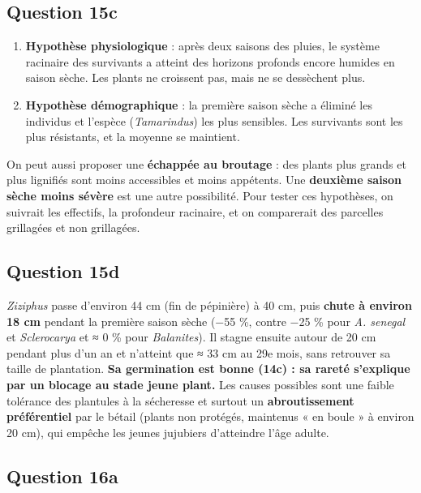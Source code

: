 \documentclass[11pt,a4paper]{article}
\providecommand{\tightlist}{\setlength{\itemsep}{0pt}\setlength{\parskip}{0pt}}
\begin{document}
\hypertarget{question-15c}{%
\subsection{Question 15c}\label{question-15c}}

\begin{enumerate}
\def\labelenumi{\arabic{enumi}.}
\tightlist
\item
  \textbf{Hypothèse physiologique} : après deux saisons des pluies, le système racinaire des survivants a atteint des horizons profonds encore humides en saison sèche. Les plants ne croissent pas, mais ne se dessèchent plus.
\item
  \textbf{Hypothèse démographique} : la première saison sèche a éliminé les individus et l'espèce (\emph{Tamarindus}) les plus sensibles. Les survivants sont les plus résistants, et la moyenne se maintient.
\end{enumerate}

On peut aussi proposer une \textbf{échappée au broutage} : des plants plus grands et plus lignifiés sont moins accessibles et moins appétents. Une \textbf{deuxième saison sèche moins sévère} est une autre possibilité. Pour tester ces hypothèses, on suivrait les effectifs, la profondeur racinaire, et on comparerait des parcelles grillagées et non grillagées.

\hypertarget{question-15d}{%
\subsection{Question 15d}\label{question-15d}}

\emph{Ziziphus} passe d'environ 44 cm (fin de pépinière) à 40 cm, puis \textbf{chute à environ 18 cm} pendant la première saison sèche (−55 \%, contre −25 \% pour \emph{A. senegal} et \emph{Sclerocarya} et ≈ 0 \% pour \emph{Balanites}). Il stagne ensuite autour de 20 cm pendant plus d'un an et n'atteint que ≈ 33 cm au 29e mois, sans retrouver sa taille de plantation. \textbf{Sa germination est bonne (14c) : sa rareté s'explique par un blocage au stade jeune plant.} Les causes possibles sont une faible tolérance des plantules à la sécheresse et surtout un \textbf{abroutissement préférentiel} par le bétail (plants non protégés, maintenus « en boule » à environ 20 cm), qui empêche les jeunes jujubiers d'atteindre l'âge adulte.

\hypertarget{question-16a}{%
\subsection{Question 16a}\label{question-16a}}
\end{document}
